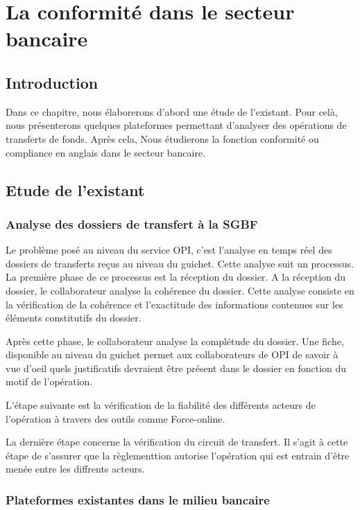 \chapter{La conformité dans le secteur bancaire}
\section*{Introduction}
Dans ce chapitre, nous élaborerons d’abord une étude de l'existant. Pour celà, 
nous présenterons quelques plateformes permettant d'analyser 
des opérations de transferts de fonds. Après cela, Nous étudierons la fonction conformité ou 
compliance en anglais dans le secteur bancaire. 


\section{Etude de l'existant}
\subsection{Analyse des dossiers de transfert à la SGBF}

Le problème posé au niveau du service OPI, c'est l'analyse en temps réel des
dossiers de transferts reçus au niveau du guichet. Cette analyse suit un
processus.
La première phase de ce processus est la réception du dossier.
A la réception du dossier, le collaborateur analyse la cohérence du dossier.
Cette analyse consiste en la vérification de la cohérence et l'exactitude des
informations contenues sur les éléments constitutifs du dossier.

Après cette phase, le collaborateur analyse la complétude du dossier. Une fiche,
disponible au niveau du guichet permet aux collaborateurs de OPI de savoir à vue
d'oeil quels justificatifs devraient être présent dans le dossier en fonction du
motif de l'opération.

L'étape suivante est la vérification de la fiabilité des différents acteurs de l'opération
à travers des outils comme Force-online.

La dernière étape concerne la vérification du circuit de transfert. Il s'agit à cette étape
de s'assurer que la règlementtion autorise l'opération qui est entrain d'être menée entre les diffrents acteurs.

\subsection{Plateformes existantes dans le milieu bancaire}

